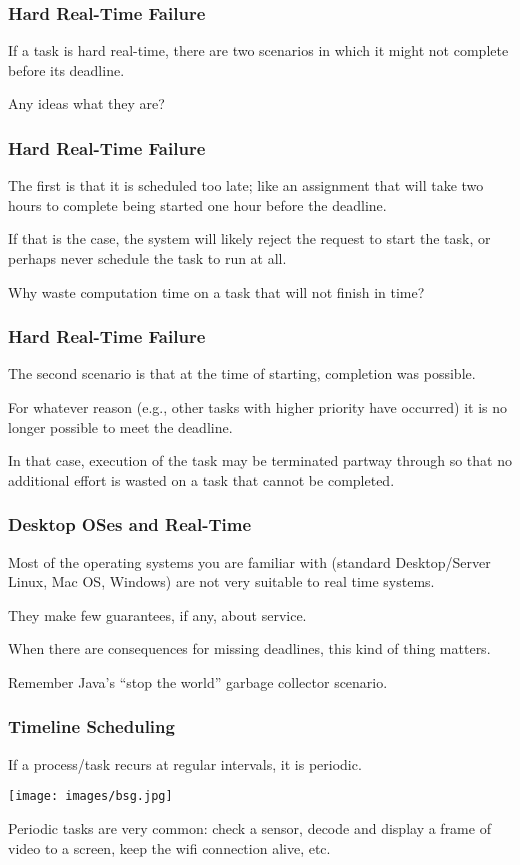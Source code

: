 \begin{frame}
\frametitle{Hard Real-Time Failure}

If a task is hard real-time, there are two scenarios in which it might not complete before its deadline. 

Any ideas what they are?

\end{frame}

\begin{frame}
\frametitle{Hard Real-Time Failure}


The first is that it is scheduled too late; like an assignment that will take two hours to complete being started one hour before the deadline. 

If that is the case, the system will likely reject the request to start the task, or perhaps never schedule the task to run at all. 

Why waste computation time on a task that will not finish in time? 

\end{frame}

\begin{frame}
\frametitle{Hard Real-Time Failure}

The second scenario is that at the time of starting, completion was possible. 

For whatever reason (e.g., other tasks with higher priority have occurred) it is no longer possible to meet the deadline. 

In that case, execution of the task may be terminated partway through so that no additional effort is wasted on a task that cannot be completed.


\end{frame}

\begin{frame}
\frametitle{Desktop OSes and Real-Time}

Most of the operating systems you are familiar with (standard Desktop/Server Linux, Mac OS, Windows) are not very suitable to real time systems. 

They make few guarantees, if any, about service. 

When there are consequences for missing deadlines, this kind of thing matters. 

Remember Java's ``stop the world'' garbage collector scenario.

\end{frame}

\begin{frame}
\frametitle{Timeline Scheduling}

If a process/task recurs at regular intervals, it is \alert{periodic}.

\begin{center}
	\texttt{[image: images/bsg.jpg]}
\end{center}

Periodic tasks are very common: check a sensor, decode and display a frame of video to a screen, keep the wifi connection alive, etc.

\end{frame}

